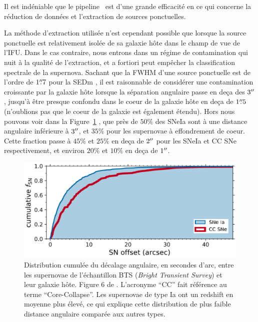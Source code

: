 \documentclass[../main/main.tex]{subfiles}
\begin{document}
Il est indéniable que le pipeline \pysedm\ est d'une grande efficacité en ce qui concerne la
réduction de données et l'extraction de sources ponctuelles.

La méthode d'extraction utilisée n'est cependant possible que lorsque la
source ponctuelle est relativement
isolée de sa galaxie hôte dans le champ de vue de l'IFU. Dans le cas
contraire, nous entrons dans un régime de contamination qui nuit à la
qualité de l'extraction, et a fortiori peut empêcher la classification
spectrale de la supernova. Sachant que la FWHM d'une source ponctuelle
est de l'ordre de $1\overset{\prime\prime}{.}7$ pour la SEDm \citep{SEDM18}, il est raisonnable de
considérer une contamination croissante par la galaxie hôte lorsque la
séparation angulaire passe en deça des $3^{\prime\prime}$, jusqu'à être presque
confondu dans le coeur de la galaxie hôte en deça de $1\overset{\prime\prime}{.}5$
(n'oublions pas que le coeur de la galaxie
est également étendu). Hors nous pouvons voir dans la
Figure~\ref{fig:cumulsnhostdist} \citep{FremlingZTFspec2020}, que près
de $50\%$ des SNeIa sont à une distance angulaire inférieure à
$3^{\prime\prime}$, et $35\%$ pour les supernovae à effondrement de coeur. Cette
fraction passe à $45\%$ et $25\%$ en deça de $2^{\prime\prime}$ pour les SNeIa
et CC SNe respectivement, et environ $20\%$
et $10\%$ en deça de $1^{\prime\prime}$.


\begin{figure}[ht]
  \begin{minipage}[c]{0.53\textwidth}
    \includegraphics[width=\textwidth]{../figures/03_sedm/cumulsnhostdist.png}
  \end{minipage}\hfill
  \begin{minipage}[c]{0.43\textwidth}
    \caption[Distribution cumulée du décalage angulaire entre les
    supernovae BTS et leur galaxie hôte]{Distribution cumulée du décalage angulaire, en
    secondes d'arc, entre les supernovae de l'échantillon BTS (\textit{Bright Transient Survey}) et leur galaxie hôte.
    Figure 6 de \citet{FremlingZTFspec2020}. L'acronyme ``CC'' fait référence au
    terme ``Core-Collapse''. Les supernovae de type Ia ont
  un redshift en moyenne plus élevé, ce qui explique cette
  distribution de plus faible distance angulaire comparée aux autres types.}\label{fig:cumulsnhostdist}
  \end{minipage}
\end{figure}
\end{document}
